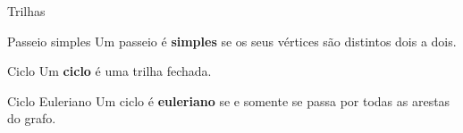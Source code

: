 \documentclass[xcolor=dvipsnames,table]{beamer}
\begin{document}
	\begin{frame}{Trilhas}
		\begin{block}{Passeio simples}
			Um passeio é {\bf simples} se os seus vértices são distintos dois a dois.
		\end{block} \pause
		\begin{block}{Ciclo}
			Um {\bf ciclo} é uma trilha fechada.
		\end{block} \pause
		\begin{block}{Ciclo Euleriano}
			Um ciclo é {\bf euleriano} se e somente se passa por todas as arestas do grafo.
		\end{block}
	\end{frame}
	
	\begin{frame}
		\titlepage
	\end{frame}
	
\end{document}
